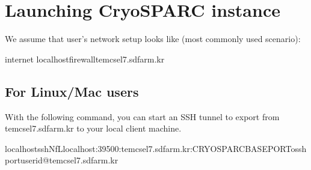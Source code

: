 \documentclass[a4paper,11pt,english]{sphinxmanual}
\begin{document}
\section{Launching CryoSPARC instance}
\label{\detokenize{cryoSPARC:launching-cryosparc-instance}}
\sphinxAtStartPar
We assume that user’s network setup looks like (most commonly used scenario):

\begin{sphinxVerbatim}[commandchars=\\\{\}]
internet
\PYG{o}{[}localhost\PYG{o}{]}\PYG{o}{[}firewalltem\PYGZhy{}cs\PYGZhy{}el7.sdfarm.kr\PYG{o}{]}
\end{sphinxVerbatim}


\subsection{For Linux/Mac users}
\label{\detokenize{cryoSPARC:for-linux-mac-users}}
\sphinxAtStartPar
With the following command, you can start an SSH tunnel to export  from tem\sphinxhyphen{}cs\sphinxhyphen{}el7.sdfarm.kr to your local client machine.

\begin{sphinxVerbatim}[commandchars=\\\{\}]
localhost\PYGZdl{}\PYGZgt{}ssh\PYGZhy{}N\PYGZhy{}f\PYGZhy{}Llocalhost:39500:tem\PYGZhy{}cs\PYGZhy{}el7.sdfarm.kr:\PYGZlt{}CRYOSPARC\PYGZus{}BASE\PYGZus{}PORT\PYGZgt{}\PYGZhy{}o\PYGZlt{}ssh\PYGZus{}port\PYGZgt{}\PYGZlt{}userid\PYGZgt{}@tem\PYGZhy{}cs\PYGZhy{}el7.sdfarm.kr

\end{sphinxVerbatim}
\end{document}
